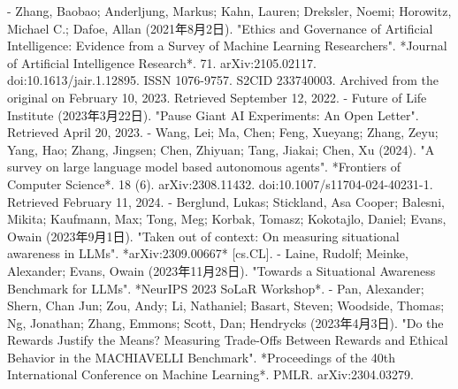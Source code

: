 \begin{enumerate}
- Zhang, Baobao; Anderljung, Markus; Kahn, Lauren; Dreksler, Noemi; Horowitz, Michael C.; Dafoe, Allan (2021年8月2日). "Ethics and Governance of Artificial Intelligence: Evidence from a Survey of Machine Learning Researchers". *Journal of Artificial Intelligence Research*. 71. arXiv:2105.02117. doi:10.1613/jair.1.12895. ISSN 1076-9757. S2CID 233740003. Archived from the original on February 10, 2023. Retrieved September 12, 2022.
- Future of Life Institute (2023年3月22日). "Pause Giant AI Experiments: An Open Letter". Retrieved April 20, 2023.
- Wang, Lei; Ma, Chen; Feng, Xueyang; Zhang, Zeyu; Yang, Hao; Zhang, Jingsen; Chen, Zhiyuan; Tang, Jiakai; Chen, Xu (2024). "A survey on large language model based autonomous agents". *Frontiers of Computer Science*. 18 (6). arXiv:2308.11432. doi:10.1007/s11704-024-40231-1. Retrieved February 11, 2024.
- Berglund, Lukas; Stickland, Asa Cooper; Balesni, Mikita; Kaufmann, Max; Tong, Meg; Korbak, Tomasz; Kokotajlo, Daniel; Evans, Owain (2023年9月1日). "Taken out of context: On measuring situational awareness in LLMs". *arXiv:2309.00667* [cs.CL].
- Laine, Rudolf; Meinke, Alexander; Evans, Owain (2023年11月28日). "Towards a Situational Awareness Benchmark for LLMs". *NeurIPS 2023 SoLaR Workshop*.
- Pan, Alexander; Shern, Chan Jun; Zou, Andy; Li, Nathaniel; Basart, Steven; Woodside, Thomas; Ng, Jonathan; Zhang, Emmons; Scott, Dan; Hendrycks (2023年4月3日). "Do the Rewards Justify the Means? Measuring Trade-Offs Between Rewards and Ethical Behavior in the MACHIAVELLI Benchmark". *Proceedings of the 40th International Conference on Machine Learning*. PMLR. arXiv:2304.03279.
\end{enumerate}